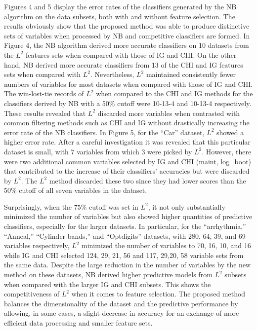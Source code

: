 \documentclass[review]{elsarticle}
\begin{document}
Figures 4 and 5 display the error rates of the classifiers generated by the NB algorithm on the data subsets, both with and without feature selection. The results obviously show that the proposed method was able to produce distinctive sets of variables when processed by NB and competitive classifiers are formed. In Figure 4, the NB algorithm derived more accurate classifiers on 10 datasets from the $ L^2 $ features sets when compared with those of IG and CHI. On the other hand, NB derived more accurate classifiers from 13 of the CHI and IG features sets when compared with $ L^2 $. Nevertheless, $ L^2 $ maintained consistently fewer numbers of variables for most datasets when compared with those of IG and CHI. The win-lost-tie records of $ L^2 $ when compared to the CHI and IG methods for the classifiers derived by NB with a 50\% cutoff were 10-13-4 and 10-13-4 respectively. These results revealed that $ L^2 $ discarded more variables when contrasted with common filtering methods such as CHI and IG without drastically increasing the error rate of the NB classifiers. In Figure 5, for the “Car” dataset, $ L^2 $ showed a higher error rate. After a careful investigation it was revealed that this particular dataset is small, with 7 variables from which 3 were picked by $ L^2 $. However, there were two additional common variables selected by IG and CHI (maint, log\_boot) that contributed to the increase of their classifiers’ accuracies but were discarded by $ L^2 $. The $ L^2 $ method discarded these two since they had lower scores than the 50\% cutoff of all seven variables in the dataset. 

Surprisingly, when the 75\% cutoff was set in $ L^2 $, it not only substantially minimized the number of variables but also showed higher quantities of predictive classifiers, especially for the larger datasets. In particular, for the “arrhythmia,” “Anneal,” “Cylinder-bands,” and “Optdigits” datasets, with 280, 64, 39, and 69 variables respectively, $ L^2 $ minimized the number of variables to 70, 16, 10, and 16 while IG and CHI selected 124, 29, 21, 56 and 117, 29,20, 58  variable sets from the same data. Despite the large reduction in the number of variables by the new method on these datasets, NB derived higher predictive models from $ L^2 $ subsets when compared with the larger IG and CHI subsets. This shows the competitiveness of $ L^2 $ when it comes to feature selection. The proposed method balances the dimensionality of the dataset and the predictive performance by allowing, in some cases, a slight decrease in accuracy for an exchange of more efficient data processing and smaller feature sets. 
\end{document}
